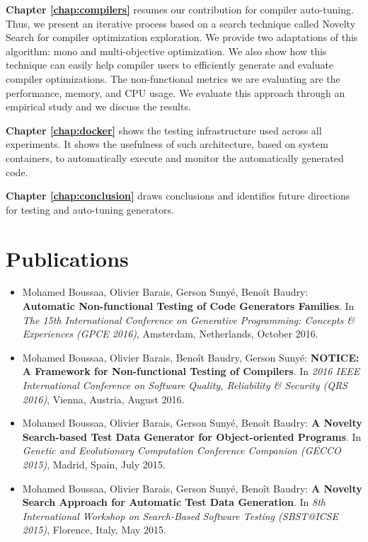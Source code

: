 \textbf{Chapter \ref{chap:compilers}} resumes our contribution for compiler auto-tuning. Thus, we present an iterative process based on a search technique called Novelty Search for compiler optimization exploration. We provide two adaptations of this algorithm: mono and multi-objective optimization. We also show how this technique can easily help compiler users to efficiently generate and evaluate compiler optimizations. The non-functional metrics we are evaluating are the performance, memory, and CPU usage. We evaluate this approach through an empirical study and we discuss the results.

\textbf{Chapter \ref{chap:docker}} shows the testing infrastructure used across all experiments. It shows the usefulness of such architecture, based on system containers, to automatically execute and monitor the automatically generated code. 

\textbf{Chapter \ref{chap:conclusion}} draws conclusions and identifies future directions for testing and auto-tuning generators.

\section{Publications}

\begin{itemize}
	
	\item Mohamed Boussaa, Olivier Barais, Gerson Suny\'e, Beno\^it Baudry:
	\textbf{Automatic Non-functional Testing of Code Generators Families}. In
	\textit{The 15th International Conference on Generative Programming: Concepts \& Experiences (GPCE 2016)},
	Amsterdam, Netherlands, October 2016.

	\item Mohamed Boussaa, Olivier Barais, Beno\^it Baudry, Gerson Suny\'e:
	\textbf{NOTICE: A Framework for Non-functional Testing of Compilers}. In 
	\textit{2016 IEEE International Conference on Software Quality, Reliability \& Security (QRS 2016)}, Vienna, Austria, August 2016.
	
	\item Mohamed Boussaa, Olivier Barais, Gerson Suny\'e, Beno\^it Baudry:
	\textbf{A Novelty Search-based Test Data Generator for Object-oriented Programs}. In 
	\textit{Genetic and Evolutionary Computation Conference Companion (GECCO 2015)}, 
	Madrid, Spain, July 2015.
	
	\item Mohamed Boussaa, Olivier Barais, Gerson Suny\'e, Beno\^it Baudry:
	\textbf{A Novelty Search Approach for Automatic Test Data Generation}. In
	\textit{8th International Workshop on Search-Based Software Testing (SBST@ICSE 2015)}, 
	Florence, Italy, May 2015.

	
	
\end{itemize}


